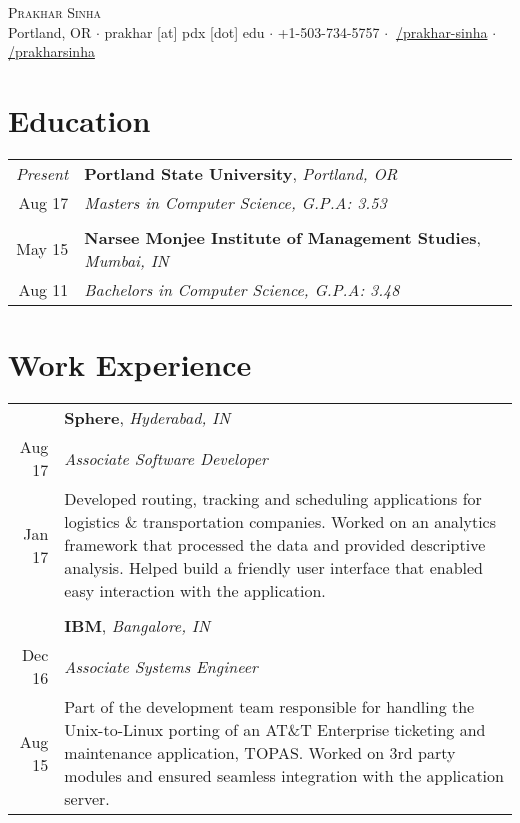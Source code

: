 \documentclass[a4paper,10pt]{article}
\begin{document}
\pagestyle{empty} %

\begin{center}
	{\Huge \scshape {Prakhar Sinha}}\\
	Portland, OR $\cdot$ prakhar [at] pdx [dot] edu $\cdot$ +1-503-734-5757 $\cdot$ \href{https://linkedin.com/in/prakhar-sinha/}{\faLinkedinSquare $\:$/prakhar-sinha}  $\cdot$ \href{https://github.com/prakharsinha}{\faGithubSquare $\:$/prakharsinha}\\
\end{center}
 
\section{Education}
\begin{tabular}{r|p{16cm}}
 \emph{Present} & \textbf{Portland State University}, \emph{Portland, OR} \\ 
 Aug \textquotesingle{}17 & \emph{Masters in Computer Science, \textit{G.P.A: 3.53}}\\\multicolumn{2}{c}{} \\
 May \textquotesingle{}15 & \textbf{Narsee Monjee Institute of Management Studies}, \emph{Mumbai, IN} \\
 Aug \textquotesingle{}11 & \emph{Bachelors in Computer Science, \textit{G.P.A: 3.48}}\\%
\end{tabular}

\section{Work Experience}
\begin{tabular}{r|p{16cm}}
 & \textbf{Sphere}, \sl{Hyderabad, IN} \\ 
 {Aug \textquotesingle{}17} & \emph{Associate Software Developer}\\
 {Jan \textquotesingle{}17} & \footnotesize{Developed routing, tracking and scheduling applications for logistics \& transportation companies. Worked on an analytics framework that processed the data and provided descriptive analysis. Helped build a friendly user interface that enabled easy interaction with the application.}\\\multicolumn{2}{c}{} \\
 
 & \textbf{IBM}, \sl{Bangalore, IN} \\
 {Dec \textquotesingle{}16} & \emph{Associate Systems Engineer}\\
 {Aug \textquotesingle{}15} & \footnotesize{Part of the development team responsible for handling the Unix-to-Linux porting of an AT\&T Enterprise ticketing and maintenance application, TOPAS. Worked on 3rd party modules and ensured seamless integration with the application server.}\\%
\end{tabular}
\end{document}

